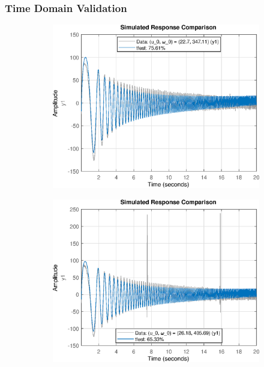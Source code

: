 \subsubsection{Time Domain Validation}
\begin{figure}[H]
    \begin{minipage}{0.32\textwidth}
       \begin{figure}[H]
            \includegraphics[width = \textwidth]{./figs/small_perturbation/time_Compare_1250.eps}
       \end{figure}
    \end{minipage}
    \begin{minipage}{0.32\textwidth}
       \begin{figure}[H]
            \includegraphics[width = \textwidth]{./figs/small_perturbation/time_Compare_1300.eps}

\end{figure}
\end{minipage}
\end{figure}
